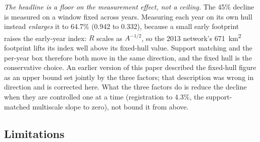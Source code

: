 \documentclass[fleqn,10pt,lineno]{wlpeerj}
\newcommand{\rOwnHull}{64.7}
\newcommand{\rOwnHullFirst}{0.942}
\newcommand{\rOwnHullLast}{0.332}
\newcommand{\locHullDrop}{45}
\begin{document}
\noindent\emph{The headline is a floor on the measurement effect, not a ceiling.} The
\locHullDrop\% decline is measured on a window fixed across years. Measuring each year on its own
hull instead \emph{enlarges} it to \rOwnHull\% (\rOwnHullFirst{} to \rOwnHullLast), because a
small early footprint raises the early-year index: $R$ scales as $A^{-1/2}$, so the 2013 network's
\SI{671}{\kilo\meter\squared} footprint lifts its index well above its fixed-hull value. Support
matching and the per-year box therefore both move in the same direction, and the fixed hull is the
conservative choice. An earlier version of this paper described the fixed-hull figure as an upper
bound set jointly by the three factors; that description was wrong in direction and is corrected
here. What the three factors do is reduce the decline when they are controlled one at a time
(registration to \num{4.3}\%, the support-matched multiscale slope to zero), not bound it from
above.

\subsection*{Limitations}
\label{sec:limits}
\end{document}
